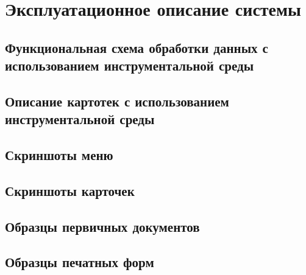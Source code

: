 \section{Эксплуатационное описание системы}
\subsection{Функциональная схема обработки данных с использованием инструментальной среды}
\subsection{Описание картотек с использованием инструментальной среды}
\subsection{Скриншоты меню}
\subsection{Скриншоты карточек}
\subsection{Образцы первичных документов}
\subsection{Образцы печатных форм}
\newpage
